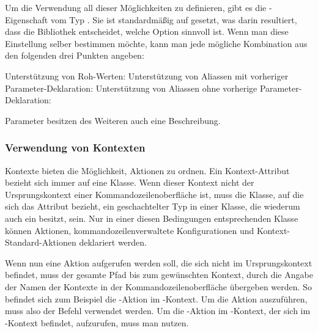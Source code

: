 Um die Verwendung all dieser Möglichkeiten zu definieren, gibt es die -Eigenschaft vom Typ .
Sie ist standardmä\ss ig auf  gesetzt, was darin resultiert, dass die Bibliothek entscheidet, welche Option sinnvoll ist.
Wenn man diese Einstellung selber bestimmen möchte, kann man jede mögliche Kombination aus den folgenden drei Punkten angeben:
\begin{outline}
 \1 Unterstützung von Roh-Werten: 
 \1 Unterstützung von Aliassen mit vorheriger Parameter-Deklaration: 
 \1 Unterstützung von Aliassen ohne vorherige Parameter-Deklaration: 
\end{outline}

Parameter besitzen des Weiteren auch eine Beschreibung.

\subsubsection{Verwendung von Kontexten}
Kontexte bieten die Möglichkeit, Aktionen zu ordnen.
Ein Kontext-Attribut bezieht sich immer auf eine Klasse.
Wenn dieser Kontext nicht der Ursprungskontext einer Kommandozeilenoberfläche ist, 
muss die Klasse, auf die sich das Attribut bezieht, ein geschachtelter Typ in einer Klasse, die wiederum auch ein  besitzt, sein.
Nur in einer diesen Bedingungen entsprechenden Klasse können Aktionen, kommandozeilenverwaltete Konfigurationen und Kontext-Standard-Aktionen deklariert werden.

Wenn nun eine Aktion aufgerufen werden soll, die sich nicht im Ursprungskontext befindet,
muss der gesamte Pfad bis zum gewünschten Kontext, durch die Angabe der Namen der Kontexte in der Kommandozeilenoberfläche übergeben werden.
So befindet sich zum Beispiel die -Aktion im -Kontext.
Um die Aktion auszuführen, muss also der Befehl  verwendet werden.
Um die -Aktion im -Kontext, der sich im -Kontext befindet,
aufzurufen, muss man  nutzen.

